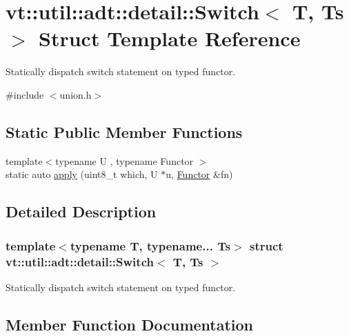 \hypertarget{structvt_1_1util_1_1adt_1_1detail_1_1_switch}{}\section{vt\+:\+:util\+:\+:adt\+:\+:detail\+:\+:Switch$<$ T, Ts $>$ Struct Template Reference}
\label{structvt_1_1util_1_1adt_1_1detail_1_1_switch}


Statically dispatch switch statement on typed functor.  




{\ttfamily \#include $<$union.\+h$>$}

\subsection*{Static Public Member Functions}
\begin{DoxyCompactItemize}
\item 
{\footnotesize template$<$typename U , typename Functor $>$ }\\static auto \hyperlink{structvt_1_1util_1_1adt_1_1detail_1_1_switch_a966aa783a3f5efdf75529f2eb27062b8}{apply} (uint8\+\_\+t which, U $\ast$u, \hyperlink{namespacevt_af182285b57b225b163d5d8aff03cb8c2ac61e9f48e514369f0eb8ac5cebf9fb14}{Functor} \&fn)
\end{DoxyCompactItemize}


\subsection{Detailed Description}
\subsubsection*{template$<$typename T, typename... Ts$>$\newline
struct vt\+::util\+::adt\+::detail\+::\+Switch$<$ T, Ts $>$}

Statically dispatch switch statement on typed functor. 

\subsection{Member Function Documentation}
\mbox{\label{structvt_1_1util_1_1adt_1_1detail_1_1_switch_a966aa783a3f5efdf75529f2eb27062b8}} 

